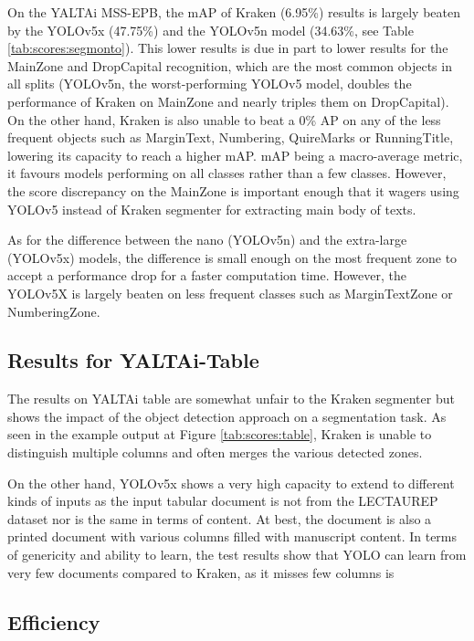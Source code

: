 \documentclass{jdmdh}
\begin{document}
On the YALTAi MSS-EPB, the mAP of Kraken (6.95\%) results is largely beaten by the YOLOv5x (47.75\%) and the YOLOv5n model (34.63\%, see Table \ref{tab:scores:segmonto}). This lower results is due in part to lower results for the MainZone and DropCapital recognition, which are the most common objects in all splits (YOLOv5n, the worst-performing YOLOv5 model, doubles the performance of Kraken on MainZone and nearly triples them on DropCapital). On the other hand, Kraken is also unable to beat a 0\% AP on any of the less frequent objects such as MarginText, Numbering, QuireMarks or RunningTitle, lowering its capacity to reach a higher mAP. mAP being a macro-average metric, it favours models performing on all classes rather than a few classes. However, the score discrepancy on the MainZone is important enough that it wagers using YOLOv5 instead of Kraken segmenter for extracting main body of texts.

As for the difference between the nano (YOLOv5n) and the extra-large (YOLOv5x) models, the difference is small enough on the most frequent zone to accept a performance drop for a faster computation time. However, the YOLOv5X is largely beaten on less frequent classes such as MarginTextZone or NumberingZone.

\subsection{Results for YALTAi-Table}

The results on YALTAi table are somewhat unfair to the Kraken segmenter but shows the impact of the object detection approach on a segmentation task. As seen in the example output at Figure \ref{tab:scores:table}, Kraken is unable to distinguish multiple columns and often merges the various detected zones. 

On the other hand, YOLOv5x shows a very high capacity to extend to different kinds of inputs as the input tabular document is not from the LECTAUREP dataset nor is the same in terms of content. At best, the document is also a printed document with various columns filled with manuscript content. In terms of genericity and ability to learn, the test results show that YOLO can learn from very few documents compared to Kraken, as it misses few columns is

\subsection{Efficiency}
\end{document}
